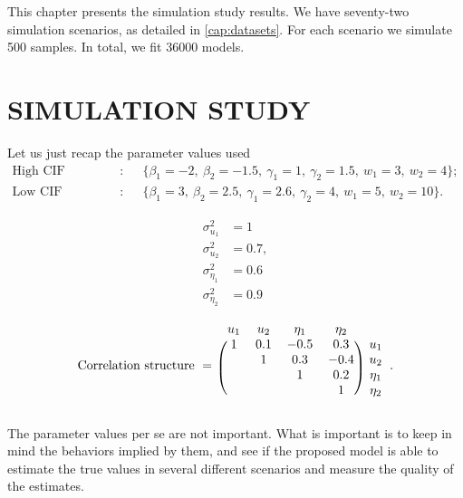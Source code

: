 This chapter presents the simulation study results. We have seventy-two
simulation scenarios, as detailed in \autoref{cap:datasets}. For each
scenario we simulate 500 samples. In total, we fit 36000 models.

\section{SIMULATION STUDY}
\label{cap:simures}

Let us just recap the parameter values used
\begin{align*}
 \text{High CIF configuration}:~&\quad
 \{\beta_{1} = -2,~\beta_{2} = -1.5,~\gamma_{1} = 1,~\gamma_{2} = 1.5,~
   w_{1} = 3,~w_{2} = 4
 \};\\
 \text{Low CIF configuration}:~&\quad
 \{\beta_{1} = 3,~\beta_{2} = 2.5,~\gamma_{1} = 2.6,~\gamma_{2} = 4,~
   w_{1} = 5,~w_{2} = 10
 \}.
\end{align*}
\begin{minipage}{0.15\textwidth}
 \begin{align*}
  \sigma_{u_{1}}^{2}   &= 1\\
  \sigma_{u_{2}}^{2}   &= 0.7,\\
  \sigma_{\eta_{1}}^{2} &= 0.6\\
  \sigma_{\eta_{2}}^{2} &= 0.9
 \end{align*}
\end{minipage}%
\begin{minipage}{0.85\textwidth}
 \[
  \text{Correlation structure}~=~\begin{blockarray}{ccccc}
                                  u_{1} & u_{2} & \eta_{1} & \eta_{2}\\
                                  \begin{block}{(cccc)c}
                                   1 & 0.1 & -0.5 &  0.3 & u_{1}\\
                                     &   1 &  0.3 & -0.4 & u_{2}\\
                                     &     &    1 &  0.2 & \eta_{1}\\
                                     &     &      &    1 & \eta_{2}\\
                                  \end{block}
                                 \end{blockarray}.
 \]
\end{minipage}

\vspace{0.3cm}
\noindent
The parameter values per se are not important. What is important is to
keep in mind the behaviors implied by them, and see if the proposed
model is able to estimate the true values in several different scenarios
and measure the quality of the estimates.


